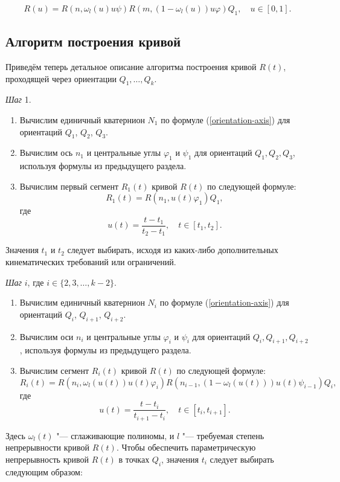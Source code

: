 $$
R(u)=R(n,\omega_l(u)u\psi)R(m,(1-\omega_l(u))u\varphi)Q_1, \quad u \in [0,1].
$$

\subsection*{Алгоритм построения кривой}

Приведём теперь детальное описание алгоритма построения кривой $R(t)$, проходящей через ориентации $Q_1,\dots,Q_k$.

\bigskip
\textit{Шаг} 1.

\begin{enumerate}
\item Вычислим единичный кватернион $N_1$ по формуле (\ref{orientation-axis}) для ориентаций $Q_1$, $Q_2$, $Q_3$.
\item Вычислим ось $n_1$ и центральные углы $\varphi_1$ и $\psi_1$ для ориентаций $Q_1,Q_2,Q_3$, используя формулы из
предыдущего раздела.
\item Вычислим первый сегмент $R_1(t)$ кривой $R(t)$ по следующей формуле:
$$
R_1(t)=R(n_1,u(t)\varphi_1)Q_1,
$$
\noindent где
$$
u(t)=\frac{t-t_1}{t_2-t_1}, \quad t \in [t_1,t_2].
$$
\end{enumerate}

Значения $t_1$ и $t_2$ следует выбирать, исходя из каких-либо дополнительных кинематических требований или ограничений.

\bigskip
\textit{Шаг} $i$, где $i \in \{2,3,\dots,k-2\}$.

\begin{enumerate}
\item Вычислим единичный кватернион $N_i$ по формуле (\ref{orientation-axis}) для ориентаций $Q_i$, $Q_{i+1}$,
$Q_{i+2}$.
\item Вычислим оси $n_i$ и центральные углы $\varphi_i$ и $\psi_i$ для ориентаций $Q_i, Q_{i+1}, Q_{i+2}$, используя
формулы из предыдущего раздела.
\item Вычислим сегмент $R_i(t)$ кривой $R(t)$ по следующей формуле:
$$
R_i(t)=R(n_i,\omega_l(u(t))u(t)\varphi_i)R(n_{i-1},(1-\omega_l(u(t)))u(t)\psi_{i-1})Q_i,
$$
\noindent где
$$
u(t)=\frac{t-t_i}{t_{i+1}-t_i}, \quad t \in [t_i,t_{i+1}].
$$
\end{enumerate}

Здесь $\omega_l(t)$ "--- сглаживающие полиномы, и $l$ "--- требуемая степень непрерывности кривой $R(t)$. Чтобы обеспечить
параметрическую непрерывность кривой $R(t)$ в точках $Q_i$, значения $t_i$ следует выбирать следующим образом:

